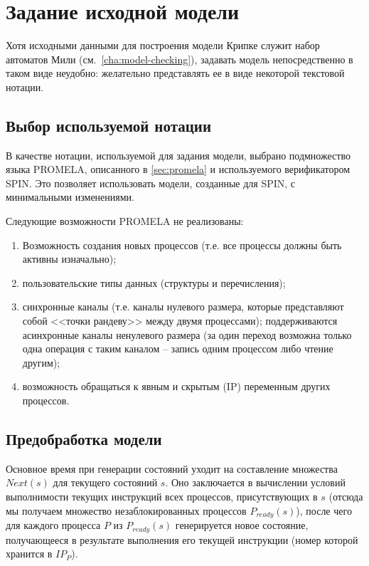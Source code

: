 \chapter{Задание исходной модели}
\label{cha:code-gen}

Хотя исходными данными для построения модели Крипке служит набор автоматов Мили
(см.~\ref{cha:model-checking}), задавать модель непосредственно в таком виде неудобно:
желательно представлять ее в виде некоторой текстовой нотации.

\section{Выбор используемой нотации}
\label{sec:notation-choice}

В качестве нотации, используемой для задания модели, выбрано подмножество языка PROMELA,
описанного в \ref{sec:promela} и используемого верификатором SPIN. Это позволяет
использовать модели, созданные для SPIN, с минимальными изменениями. 

Следующие возможности PROMELA не реализованы:

\begin{enumerate}
\item Возможность создания новых процессов (т.е. все процессы должны быть активны изначально);
\item пользовательские типы данных (структуры и перечисления);
\item синхронные каналы (т.е. каналы нулевого размера, которые представляют собой <<точки
  рандеву>> между двумя процессами); поддерживаются асинхронные каналы ненулевого размера
  (за один переход возможна только одна операция с таким каналом -- запись одним процессом
  либо чтение другим);
\item возможность обращаться к явным и скрытым (IP) переменным других процессов.
\end{enumerate}

\section{Предобработка модели}
\label{sec:idef0-codegen}

Основное время при генерации состояний уходит на составление множества $Next(s)$ для
текущего состояний $s$. Оно заключается в вычислении условий выполнимости текущих
инструкций всех процессов, присутствующих в $s$ (отсюда мы получаем множество
незаблокированных процессов $P_{ready}(s)$), после чего для каждого процесса $P$ из
$P_{ready}(s)$ генерируется новое состояние, получающееся в результате выполнения его
текущей инструкции (номер которой хранится в $IP_P$).

